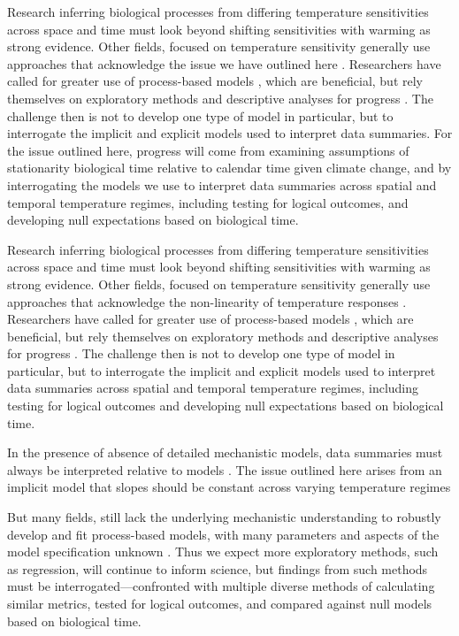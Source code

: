 \documentclass[11pt,letter]{article}
\begin{document}
Research inferring biological processes from differing temperature sensitivities across space and time must look beyond shifting sensitivities with warming as strong evidence. Other fields, focused on temperature sensitivity generally use approaches that acknowledge the issue we have outlined here \citep[e.g.,][]{yuste2004}. Researchers have called for greater use of process-based models \citep{keenan2019}, which are beneficial, but rely themselves on exploratory methods and descriptive analyses for progress \citep{chuine2016}. The challenge then is not to develop one type of model in particular, but to interrogate the implicit and explicit models used to interpret data summaries. For the issue outlined here, progress will come from examining assumptions of stationarity biological time relative to calendar time given climate change, and by interrogating the models we use to interpret data summaries across spatial and temporal temperature regimes, including testing for logical outcomes, and developing null expectations based on biological time. 

Research inferring biological processes from differing temperature sensitivities across space and time must look beyond shifting sensitivities with warming as strong evidence. Other fields, focused on temperature sensitivity generally use approaches that acknowledge the non-linearity of temperature responses \citep[e.g.,][]{yuste2004}. Researchers have called for greater use of process-based models \citep{keenan2019}, which are beneficial, but rely themselves on exploratory methods and descriptive analyses for progress \citep{chuine2016}. The challenge then is not to develop one type of model in particular, but to interrogate the implicit and explicit models used to interpret data summaries across spatial and temporal temperature regimes, including testing for logical outcomes and developing null expectations based on biological time. 



In the presence of absence of detailed mechanistic models, data summaries must always be interpreted relative to models . The issue outlined here arises from an implicit model that  slopes should be constant across varying temperature regimes


But many fields, still lack the underlying mechanistic understanding to robustly develop and fit process-based models, with many parameters and aspects of the model specification unknown \citep{chuine2016}. Thus we expect more exploratory methods, such as regression, will continue to inform science, but findings from such methods must be interrogated---confronted with multiple diverse methods of calculating similar metrics, tested for logical outcomes, and compared against null models based on biological time. \\ %
\end{document}
